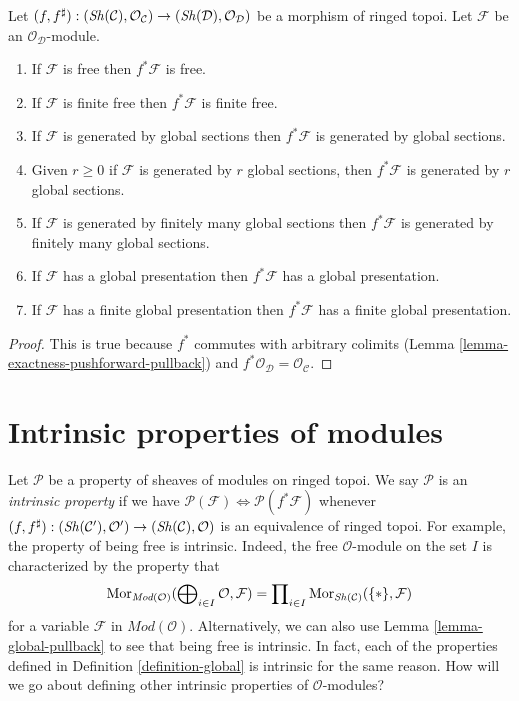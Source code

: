 \begin{lemma}
\label{lemma-global-pullback}
Let
$(f, f^\sharp) :
(\mathop{\mathit{Sh}}\nolimits(\mathcal{C}), \mathcal{O}_\mathcal{C})
\to
(\mathop{\mathit{Sh}}\nolimits(\mathcal{D}), \mathcal{O}_\mathcal{D})$
be a morphism of ringed topoi.
Let $\mathcal{F}$ be an $\mathcal{O}_\mathcal{D}$-module.
\begin{enumerate}
\item If $\mathcal{F}$ is free then $f^*\mathcal{F}$ is free.
\item If $\mathcal{F}$ is finite free then $f^*\mathcal{F}$ is finite free.
\item If $\mathcal{F}$ is generated by global sections
then $f^*\mathcal{F}$ is generated by global sections.
\item Given $r \geq 0$ if $\mathcal{F}$ is generated by $r$ global
sections, then $f^*\mathcal{F}$ is generated by $r$ global sections.
\item If $\mathcal{F}$ is generated by finitely many global sections
then $f^*\mathcal{F}$ is generated by finitely many global sections.
\item If $\mathcal{F}$ has a global presentation then
$f^*\mathcal{F}$ has a global presentation.
\item If $\mathcal{F}$ has a finite global presentation
then $f^*\mathcal{F}$ has a finite global presentation.
\end{enumerate}
\end{lemma}

\begin{proof}
This is true because $f^*$ commutes with arbitrary colimits
(Lemma \ref{lemma-exactness-pushforward-pullback})
and $f^*\mathcal{O}_\mathcal{D} = \mathcal{O}_\mathcal{C}$.
\end{proof}






\section{Intrinsic properties of modules}
\label{section-intrinsic}

\noindent
Let $\mathcal{P}$ be a property of sheaves of modules on ringed topoi.
We say $\mathcal{P}$ is an {\it intrinsic property} if we have
$\mathcal{P}(\mathcal{F}) \Leftrightarrow \mathcal{P}(f^*\mathcal{F})$
whenever $(f, f^\sharp) :
(\mathop{\mathit{Sh}}\nolimits(\mathcal{C}'), \mathcal{O}')
\to
(\mathop{\mathit{Sh}}\nolimits(\mathcal{C}), \mathcal{O})$
is an equivalence of ringed topoi.
For example, the property of being free is intrinsic. Indeed, the free
$\mathcal{O}$-module on the set $I$ is characterized by the property
that
$$
\mathop{\mathrm{Mor}}\nolimits_{\textit{Mod}(\mathcal{O})}(
\bigoplus\nolimits_{i \in I} \mathcal{O},
\mathcal{F})
=
\prod\nolimits_{i \in I} \mathop{\mathrm{Mor}}\nolimits_{\mathop{\mathit{Sh}}\nolimits(\mathcal{C})}(\{*\},
\mathcal{F})
$$
for a variable $\mathcal{F}$ in $\textit{Mod}(\mathcal{O})$.
Alternatively, we can also use Lemma \ref{lemma-global-pullback}
to see that being free is intrinsic. In fact, each of the properties
defined in Definition \ref{definition-global} is intrinsic for the
same reason.
How will we go about defining other intrinsic properties of
$\mathcal{O}$-modules?

